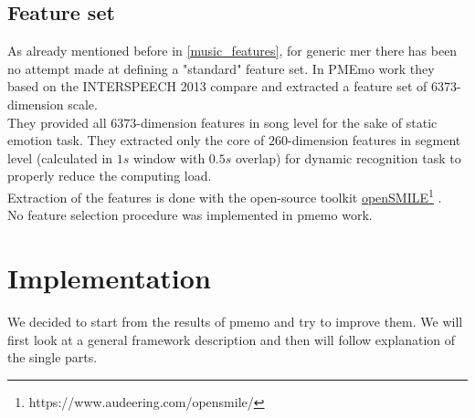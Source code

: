 \subsection{Feature set}
As already mentioned before in \ref{music_features}, for generic \gls{mer} there has been no attempt made at defining a "standard" feature set. In PMEmo work \cite{zhang2018pmemo} they based on the INTERSPEECH 2013 \gls{compare} \cite{schuller2013interspeech} and extracted a feature set of 6373-dimension scale.
\\
They provided all $6373$-dimension features in song level for the sake of static emotion task. They extracted only the core of $260$-dimension features in segment level (calculated in $1s$ window with $0.5s$ overlap) for dynamic recognition task to properly reduce the computing load.
\\
Extraction of the features is done with the open-source toolkit \href{https://www.audeering.com/opensmile/}{openSMILE}\footnote{https://www.audeering.com/opensmile/} \cite{eyben2013recent}.
\\
No feature selection procedure was implemented in \gls{pmemo} work.

\section{Implementation}
We decided to start from the results of \gls{pmemo} and try to improve them. We will first look at a general framework description and then will follow explanation of the single parts.

